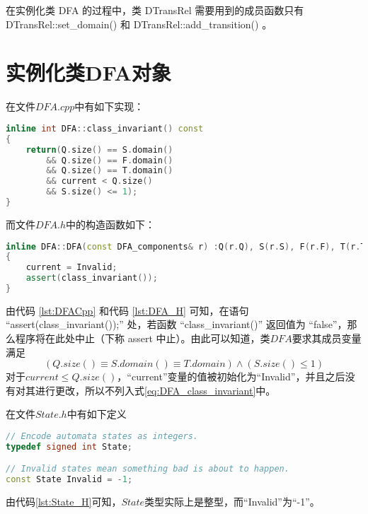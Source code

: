 在实例化类 DFA 的过程中，类 DTransRel 需要用到的成员函数只有 DTransRel::set\_domain() 和 DTransRel::add\_transition() 。







\newpage
\section{实例化类DFA对象}\label{sec:get_a_dfa}

在文件$DFA.cpp$中有如下实现：

\begin{lstlisting}[language=C++,label={lst:DFACpp},caption={DFA.cpp}]
inline int DFA::class_invariant() const
{
	return(Q.size() == S.domain()
		&& Q.size() == F.domain()
		&& Q.size() == T.domain()
		&& current < Q.size()
		&& S.size() <= 1);
}
\end{lstlisting}
而文件$DFA.h$中的构造函数如下：

\begin{lstlisting}[language=C++,label={lst:DFA_H},caption={DFA.h}]
inline DFA::DFA(const DFA_components& r) :Q(r.Q), S(r.S), F(r.F), T(r.T)
{
	current = Invalid;
	assert(class_invariant());
}
\end{lstlisting}
由代码 \ref{lst:DFACpp} 和代码 \ref{lst:DFA_H} 可知，在语句 “assert(class\_invariant());” 处，若函数 “class\_invariant()” 返回值为 “false”，那么程序将在此处中止\cite{assert_abort}（下称 assert 中止）。由此可以知道，类$DFA$要求其成员变量满足
\begin{equation}\label{eq:DFA_class_invariant}
    (Q.size() \equiv S.domain() \equiv T.domain ) \land (S.size() \leq 1)
\end{equation}
对于$current \le Q.size() $，“current”变量的值被初始化为“Invalid”，并且之后没有对其进行更改，所以不列入式\ref{eq:DFA_class_invariant}中。

在文件$State.h$中有如下定义

\begin{lstlisting}[language=C++,label={lst:State_H},caption={State.h}]
// Encode automata states as integers.
typedef signed int State;

// Invalid states mean something bad is about to happen.
const State Invalid = -1;
\end{lstlisting}
由代码\ref{lst:State_H}可知，$State$类型实际上是整型，而“Invalid”为“-1”。

